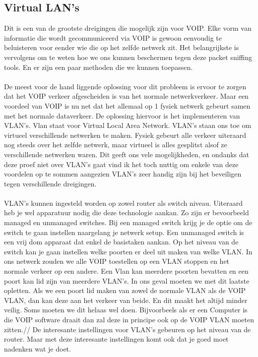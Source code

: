 \documentclass[pdftex,a4paper,12pt,twoside]{report}
\begin{document}
\subsection{Virtual LAN's}
Dit is een van de grootste dreigingen die mogelijk zijn voor VOIP. Elke vorm van informatie die wordt gecommuniceerd via VOIP is gewoon eenvoudig te beluisteren voor eender wie die op het zelfde netwerk zit. Het belangrijkste is vervolgens om te weten hoe we ons kunnen beschermen tegen deze packet sniffing tools. En er zijn een paar methoden die we kunnen toepassen.  \\ \\
De meest voor de hand liggende oplossing voor dit probleem is ervoor te zorgen dat het VOIP verkeer afgescheiden is van het normale netwerkverkeer. Maar een voordeel van VOIP is nu net dat het allemaal op 1 fysiek netwerk gebeurt samen met het normale dataverkeer. De oplossing hiervoor is het implementeren van VLAN's. Vlan staat voor  Virtual Local Area Network. VLAN's staan ons toe om virtueel verschillende netwerken te maken. Fysiek gebeurt alle verkeer uiteraard nog steeds over het zelfde netwerk, maar virtueel is alles gesplitst alsof ze verschillende netwerken waren. Dit geeft ons vele mogelijkheden, en ondanks dat deze proef niet over VLAN's gaat vind ik het toch nuttig om enkele van deze voordelen op te sommen aangezien VLAN's zeer handig zijn bij het beveiligen tegen verschillende dreigingen. 
\\
\\
VLAN's kunnen ingesteld worden op zowel router als switch niveau. Uiteraard heb je wel apparatuur nodig die deze technologie aankan. Zo zijn er bevoorbeeld managed en unmanaged switches. Bij een managed switch krijg je de optie om de switch te gaan instellen naargelang je netwerk setup. Een unmanaged switch is een vrij dom apparaat dat enkel de basistaken aankan.
Op het niveau van de switch kan je gaan instellen welke poorten er deel uit maken van welke VLAN. In ons netwerk zouden we alle VOIP toestellen op een VLAN stoppen en het normale verkeer op een andere. Een Vlan kan meerdere poorten bevatten en een poort kan lid zijn van meerdere VLAN's. In ons geval moeten we met dit laatste opletten. Als we een poort lid maken van zowel de normale VLAN als de VOIP VLAN, dan kan deze aan het verkeer van beide. En dit maakt het altijd minder veilig. Soms moeten we dit helaas wel doen. Bijvoorbeels als er een Computer is die VOIP software draait dan zal deze in principe ook op de VOIP VLAN moeten zitten.//
De interesante instellingen voor VLAN's gebeuren op het niveau van de router. Maar met deze interesante instellingen komt ook dat je goed moet nadenken wat je doet.  
\newpage
\end{document}
